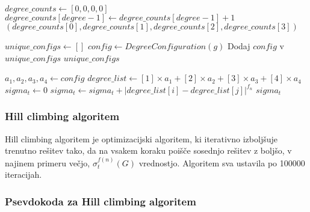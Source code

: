 \documentclass{article}
\begin{document}
\begin{algorithmic}[1]
    \State $degree\_counts \gets [0, 0, 0, 0]$
        \State $degree\_counts[degree - 1] \gets degree\_counts[degree - 1] + 1$
    \EndFor
    \State \Return $(degree\_counts[0], degree\_counts[1], degree\_counts[2], degree\_counts[3])$
\EndFunction

    \State $unique\_configs \gets []$
        \State $config \gets DegreeConfiguration(g)$
            \State Dodaj $config$ v $unique\_configs$
        \EndIf
    \EndFor
    \State \Return $unique\_configs$
\EndFunction

    \State $a_1, a_2, a_3, a_4 \gets config$
    \State $degree\_list \gets [1] \times a_1 + [2] \times a_2 + [3] \times a_3 + [4] \times a_4$
    \State $sigma_t \gets 0$
            \State $sigma_t \gets sigma_t + |degree\_list[i] - degree\_list[j]|^{f_n}$
        \EndFor
    \EndFor
    \State \Return $sigma_t$
\EndFunction
\end{algorithmic}

\vspace*{1cm}

\subsubsection*{Hill climbing algoritem}
Hill climbing algoritem je optimizacijski algoritem,
ki iterativno izboljšuje trenutno rešitev tako, da na vsakem koraku
poišče sosednjo rešitev z boljšo, v najinem primeru večjo, $\sigma_t^{f(n)}(G)$
vrednostjo. Algoritem sva ustavila po 100000 iteracijah. 

\subsubsection*{Psevdokoda za Hill climbing algoritem}
\end{document}
